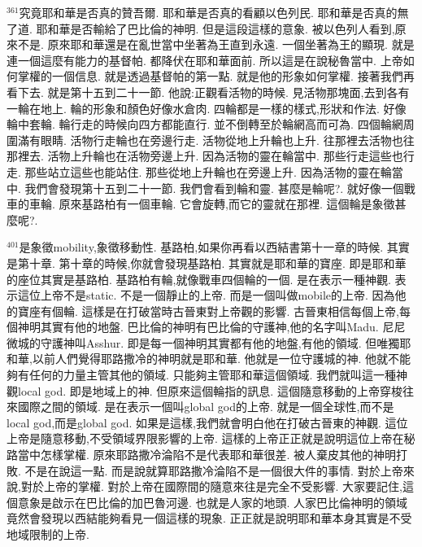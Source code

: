 \documentclass{book}
\begin{document}
$^{361}$究竟耶和華是否真的贊吾爾.
耶和華是否真的看顧以色列民.
耶和華是否真的無了道.
耶和華是否輸給了巴比倫的神明.
但是這段這樣的意象.
被以色列人看到,原來不是.
原來耶和華還是在亂世當中坐著為王直到永遠.
一個坐著為王的顯現.
就是連一個這麼有能力的基督帕.
都降伏在耶和華面前.
所以這是在說秘魯當中.
上帝如何掌權的一個信息.
就是透過基督帕的第一點.
就是他的形象如何掌權.
接著我們再看下去.
就是第十五到二十一節.
他說:正觀看活物的時候.
見活物那塊面,去到各有一輪在地上.
輪的形象和顏色好像水倉肉.
四輪都是一樣的樣式,形狀和作法.
好像輪中套輪.
輪行走的時候向四方都能直行.
並不倒轉至於輪網高而可為.
四個輪網周圍滿有眼睛.
活物行走輪也在旁邊行走.
活物從地上升輪也上升.
往那裡去活物也往那裡去.
活物上升輪也在活物旁邊上升.
因為活物的靈在輪當中.
那些行走這些也行走.
那些站立這些也能站住.
那些從地上升輪也在旁邊上升.
因為活物的靈在輪當中.
我們會發現第十五到二十一節.
我們會看到輪和靈.
甚麼是輪呢?.
就好像一個戰車的車輪.
原來基路柏有一個車輪.
它會旋轉,而它的靈就在那裡.
這個輪是象徵甚麼呢?.

$^{401}$是象徵mobility,象徵移動性.
基路柏,如果你再看以西結書第十一章的時候.
其實是第十章.
第十章的時候,你就會發現基路柏.
其實就是耶和華的寶座.
即是耶和華的座位其實是基路柏.
基路柏有輪,就像戰車四個輪的一個.
是在表示一種神觀.
表示這位上帝不是static.
不是一個靜止的上帝.
而是一個叫做mobile的上帝.
因為他的寶座有個輪.
這樣是在打破當時古晉東對上帝觀的影響.
古晉東相信每個上帝,每個神明其實有他的地盤.
巴比倫的神明有巴比倫的守護神,他的名字叫Madu.
尼尼微城的守護神叫Asshur.
即是每一個神明其實都有他的地盤,有他的領域.
但唯獨耶和華,以前人們覺得耶路撒冷的神明就是耶和華.
他就是一位守護城的神.
他就不能夠有任何的力量主管其他的領域.
只能夠主管耶和華這個領域.
我們就叫這一種神觀local god.
即是地域上的神.
但原來這個輪指的訊息.
這個隨意移動的上帝穿梭往來國際之間的領域.
是在表示一個叫global god的上帝.
就是一個全球性,而不是local god,而是global god.
如果是這樣,我們就會明白他在打破古晉東的神觀.
這位上帝是隨意移動,不受領域界限影響的上帝.
這樣的上帝正正就是說明這位上帝在秘路當中怎樣掌權.
原來耶路撒冷淪陷不是代表耶和華很差.
被人棄皮其他的神明打敗.
不是在說這一點.
而是說就算耶路撒冷淪陷不是一個很大件的事情.
對於上帝來說,對於上帝的掌權.
對於上帝在國際間的隨意來往是完全不受影響.
大家要記住,這個意象是啟示在巴比倫的加巴魯河邊.
也就是人家的地頭.
人家巴比倫神明的領域竟然會發現以西結能夠看見一個這樣的現象.
正正就是說明耶和華本身其實是不受地域限制的上帝.
\end{document}
